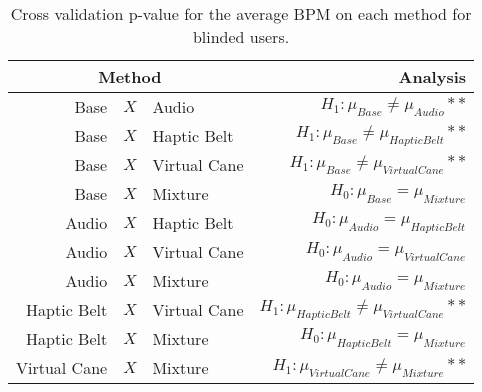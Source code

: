 
\begin{table}[!htb]
\centering
\caption{Cross validation p-value for the average BPM on each method for blinded users.}
\label{tab:lsd_bpm}
\begin{tabular}{rclr}
\toprule
      \multicolumn{3}{c}{Method} &                                           Analysis \\
\midrule
              Base & $X$ & Audio &               $H_1 : \mu_{Base} \ne \mu_{Audio}**$ \\
        Base & $X$ & Haptic Belt &         $H_1 : \mu_{Base} \ne \mu_{Haptic Belt}**$ \\
       Base & $X$ & Virtual Cane &        $H_1 : \mu_{Base} \ne \mu_{Virtual Cane}**$ \\
            Base & $X$ & Mixture &                 $H_0 : \mu_{Base} = \mu_{Mixture}$ \\
       Audio & $X$ & Haptic Belt &            $H_0 : \mu_{Audio} = \mu_{Haptic Belt}$ \\
      Audio & $X$ & Virtual Cane &           $H_0 : \mu_{Audio} = \mu_{Virtual Cane}$ \\
           Audio & $X$ & Mixture &                $H_0 : \mu_{Audio} = \mu_{Mixture}$ \\
Haptic Belt & $X$ & Virtual Cane & $H_1 : \mu_{Haptic Belt} \ne \mu_{Virtual Cane}**$ \\
     Haptic Belt & $X$ & Mixture &          $H_0 : \mu_{Haptic Belt} = \mu_{Mixture}$ \\
    Virtual Cane & $X$ & Mixture &     $H_1 : \mu_{Virtual Cane} \ne \mu_{Mixture}**$ \\
\bottomrule
\end{tabular}
\end{table}

